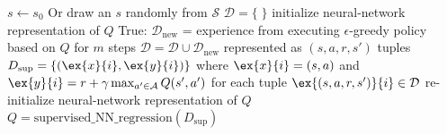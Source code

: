 \documentclass[10pt,oneside]{book}
\begin{document}
\pagestyle{empty}
\thispagestyle{empty}

\begin{codebox}
  \li $s \gets s_0$ \Comment Or draw an $s$ randomly from $\mathcal S$
  \li $\mathcal D = \{\;\}$
  \li initialize neural-network representation of $Q$
  \li \While True: \Do
  \li  $\mathcal D_\text{new}$ = experience from executing $\epsilon$-greedy policy based
  on $Q$ for $m$ steps
\li $\mathcal D = \mathcal D \cup \mathcal D_\text{new}$ represented
as $(s, a, r, s')$ tuples
\li $D_\text{sup} = \{(\ex{x}{i}, \ex{y}{i})\}$  where $\ex{x}{i} =
(s, a)$ and $\ex{y}{i} = r + \gamma \max_{a' \in \mathcal A} Q(s',
a')$ 
  \li \;\;\;for each tuple $\ex{(s, a, r, s')}{i} \in \mathcal D$ 
  \li re-initialize neural-network representation of $Q$
  \li $Q = \text{supervised\_NN\_regression}(D_\text{sup})$
\End
\end{codebox}
\end{document}
